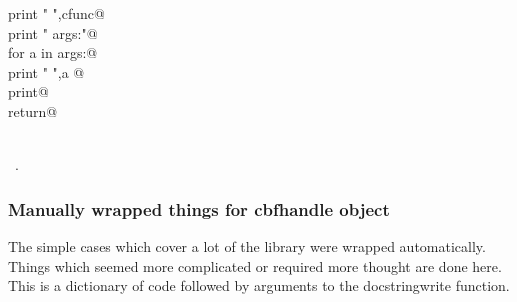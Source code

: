 \documentclass[10pt,a4paper,twoside,notitlepage]{article}
\begin{document}
\begin{flushleft}
\begin{list}{}{}
\mbox{}\verb@             print "   ",cfunc@\\
\mbox{}\verb@             print "    args:"@\\
\mbox{}\verb@             for a in args:@\\
\mbox{}\verb@                 print "       ",a @\\
\mbox{}\verb@             print@\\
\mbox{}\verb@             return@\\
\mbox{}\verb@@\\
\mbox{}\verb@@{\NWsep}
\end{list}
\vspace{-1ex}
\footnotesize\addtolength{\baselineskip}{-1ex}
\begin{list}{}{\setlength{\itemsep}{-\parsep}\setlength{\itemindent}{-\leftmargin}}
\item \NWtxtMacroRefIn\ .
\end{list}
\end{flushleft}
\subsubsection{Manually wrapped things for cbfhandle object}

The simple cases which cover a lot of the library were wrapped
automatically. Things which seemed more complicated or required
more thought are done here.
This is a dictionary of code followed by arguments to the
docstringwrite function.
\end{document}
